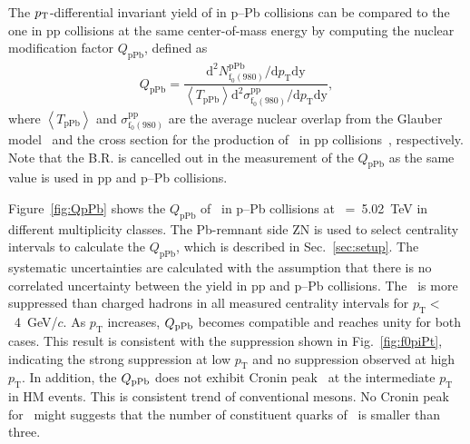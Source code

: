 The $p_{\rm{T}}$-differential invariant yield of \fzero in p--Pb collisions can be compared to the one in pp collisions at the same center-of-mass energy by computing the nuclear modification factor $Q_{\mbox{pPb}}$, defined as 
\begin{eqnarray}
Q_{\mbox{pPb}} = \dfrac{\mathrm{d}^{2} N_{\mathrm{f}_{0}(980)}^{\mathrm{pPb}} / \mathrm{d} p_{\mathrm{T}} \mathrm{dy} }{ \left\langle T_{\mathrm{pPb}} \right\rangle \mathrm{d}^{2} \sigma_{\mathrm{f}_{0}(980)}^{\mathrm{pp}}/ \mathrm{d} p_{\mathrm{T}} \mathrm{dy} },
\end{eqnarray}
where $\left\langle T_{\mathrm{pPb}} \right\rangle$ and $\sigma_{\mathrm{f}_{0}(980)}^{\mathrm{pp}}$ are the average nuclear overlap from the Glauber model~\cite{Miller:2007ri} and the cross section for the production of \fzero~in pp collisions~\cite{ALICE:2022qnb}, respectively. Note that the B.R. is cancelled out in the measurement of the $Q_{\mbox{pPb}}$ as the same value is used in pp and p--Pb collisions.

Figure~\ref{fig:QpPb} shows the $Q_{\mbox{pPb}}$ of \fzero~in p--Pb collisions at \snn~=~5.02~TeV in different multiplicity classes. The Pb-remnant side ZN is used to select centrality intervals to calculate the $Q_{\mathrm{pPb}}$, which is described in Sec.~\ref{sec:setup}. The systematic uncertainties are calculated with the assumption that there is no correlated uncertainty between the yield in pp and p--Pb collisions. The \fzero~is more suppressed than charged hadrons in all measured centrality intervals for $p_{\mathrm{T}}<$~4~GeV/$c$. As $p_{\mathrm{T}}$ increases, $Q_{\rm{pPb}}$ becomes compatible and reaches unity for both cases. This result is consistent with the suppression shown in Fig.~\ref{fig:f0piPt}, indicating the strong suppression at low $p_{\mathrm{T}}$ and no suppression observed at high $p_{\mathrm{T}}$. In addition, the $Q_{\rm{pPb}}$ does not exhibit Cronin peak~\cite{Cronin:1974zm} at the intermediate $p_{\mathrm{T}}$ in HM events. This is consistent trend of conventional mesons. No Cronin peak for \fzero~might suggests that the number of constituent quarks of \fzero~is smaller than three.